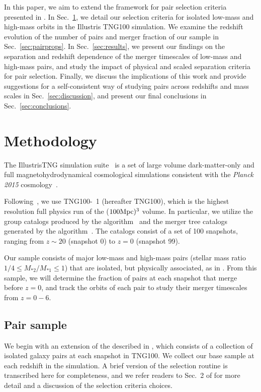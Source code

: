 \documentclass[twocolumn,linenumbers]{aastex631}
\newcommand{\chambe}{\citet{Chamberlain2024}}
\begin{document}
In this paper, we aim to extend the framework for pair selection criteria presented in \chambe{}.
In Sec.~\ref{sec:methods}, we detail our selection criteria for isolated low-mass and high-mass orbits in the Illustris TNG100 simulation. 
We examine the redshift evolution of the number of pairs and merger fraction of our sample in Sec.~\ref{sec:pairprops}.
In Sec.~\ref{sec:results}, we present our findings on the separation and redshift dependence of the merger timescales of low-mass and high-mass pairs, and study the impact of physical and scaled separation criteria for pair selection. 
Finally, we discuss the implications of this work and provide suggestions for a self-consistent way of studying pairs across redshifts and mass scales in Sec.~\ref{sec:discussion}, and present our final conclusions in Sec.~\ref{sec:conclusions}.



\section{Methodology} \label{sec:methods}
The IllustrisTNG simulation suite~\citep{TNG1,TNG2,TNG3,TNG4,TNG5} is a set of large volume dark-matter-only and full magnetohydrodynamical cosmological simulations consistent with the \textit{Planck 2015} \lcdm{} cosmology~\citep{Planck2015}. 

Following~\chambe{}, we use TNG100-~1 (hereafter TNG100), which is the highest resolution full physics run of the ($100\mathrm{Mpc})^3$ volume.
In particular, we utilize the group catalogs produced by the \subfind{} algorithm~\citep{Springel2001b,Dolag2009} and the merger tree catalogs generated by the \sublink{} algorithm~\citep{RG2015}.
The catalogs consist of a set of 100 snapshots, ranging from $z\sim20$ (snapshot 0) to $z=0$ (snapshot 99).

Our sample consists of major low-mass and high-mass pairs (stellar mass ratio $1/4 \leq M_{*2}/M_{*1}\leq 1$) that are isolated, but physically associated, as in \citet{Chamberlain2024}.
From this sample, we will determine the fraction of pairs at each snapshot that merge before $z=0$, and track the orbits of each pair to study their merger timescales from $z=0-6$.

\subsection{Pair sample}
We begin with an extension of the \paircat{} described in \chambe{}, which consists of a collection of isolated galaxy pairs at each snapshot in TNG100. 
We collect our base sample at each redshift in the simulation. 
A brief version of the selection routine is transcribed here for completeness, and we refer readers to Sec.~2 of \chambe{} for more detail and a discussion of the selection criteria choices. 
\end{document}
